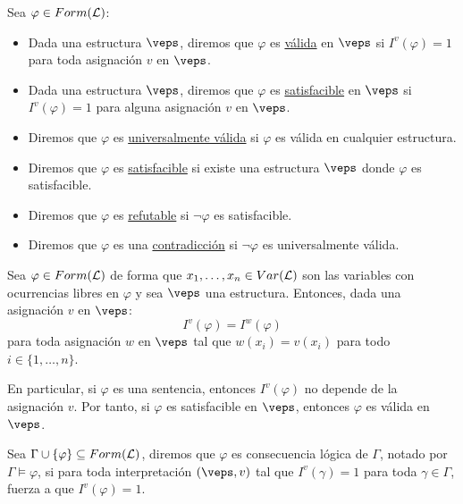 \begin{definicion}
    Sea $\varphi\in Form(\mathcal{L})$:
    \begin{itemize}
        \item Dada una estructura $\veps$, diremos que $\varphi$ es \underline{válida} en $\veps$ si $I^v(\varphi)=1$ para toda asignación $v$ en $\veps$.
        \item Dada una estructura $\veps$, diremos que $\varphi$ es \underline{satisfacible} en $\veps$ si $I^v(\varphi)=1$ para alguna asignación $v$ en $\veps$.
        \item Diremos que $\varphi$ es \underline{universalmente válida} si $\varphi$ es válida en cualquier estructura.
        \item Diremos que $\varphi$ es \underline{satisfacible} si existe una estructura $\veps$ donde $\varphi$ es satisfacible.
        \item Diremos que $\varphi$ es \underline{refutable} si $\lnot\varphi$ es satisfacible.
        \item Diremos que $\varphi$ es una \underline{contradicción} si $\lnot\varphi$ es universalmente válida.
    \end{itemize}
\end{definicion}

\begin{lema}[de Coincidencia]\label{lema:coincidencia}
    Sea $\varphi\in Form(\mathcal{L})$ de forma que $x_1,\ldots,x_n\in Var(\mathcal{L})$ son las variables con ocurrencias libres en $\varphi$ y sea $\veps$ una estructura. Entonces, dada una asignación $v$ en $\veps$:
    \begin{equation*}
        I^v(\varphi) = I^{w}(\varphi)
    \end{equation*}
    para toda asignación $w$ en $\veps$ tal que $w(x_i)=v(x_i)$ para todo $i \in \{1,\ldots,n\}$.
\end{lema}

\begin{observacion}
    En particular, si $\varphi$ es una sentencia, entonces $I^v(\varphi)$ no depende de la asignación $v$. Por tanto, si $\varphi$ es satisfacible en $\veps$, entonces $\varphi$ es válida en $\veps$.
\end{observacion}

\begin{definicion}
    Sea $\Gamma \cup \{\varphi\}\subseteq Form(\mathcal{L})$, diremos que $\varphi$ es consecuencia lógica de $\Gamma$, notado por $\Gamma\vDash \varphi$, si para toda interpretación $(\veps,v)$ tal que $I^v(\gamma)=1$ para toda $\gamma\in\Gamma$, fuerza a que $I^v(\varphi)=1$.
\end{definicion}

